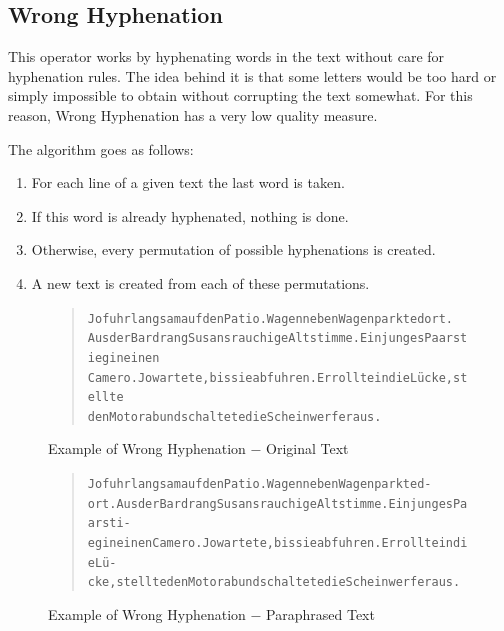 \documentclass[11pt]{reportAlternative}
\begin{document}
\subsection{Wrong Hyphenation}
This operator works by hyphenating words in the text without care for hyphenation rules. The idea behind it is that some letters would be too hard or simply impossible to obtain without corrupting the text somewhat.
For this reason, Wrong Hyphenation has a very low quality measure.

The algorithm goes as follows:
\begin{enumerate}
\item For each line of a given text the last word is taken.
\item If this word is already hyphenated, nothing is done.
\item Otherwise, every permutation of possible hyphenations is created.
\item A new text is created from each of these permutations.
\end{enumerate}

\begin{figure}[H]
	\begin{quote}
		\begin{alltt}
			Jo fuhr langsam auf den Patio. Wagen neben Wagen parkte dort. 
			Aus der Bar drang Susans rauchige Altstimme. Ein junges Paar stieg in einen
			Camero. Jo wartete, bis sie abfuhren. Er rollte in die Lücke, stellte
			den Motor ab und schaltete die Scheinwerfer aus.
		\end{alltt}
	\end{quote}
	\caption{Example of Wrong Hyphenation $-$ Original Text}
\end{figure}

\begin{figure}[H]
	\begin{quote}
		\begin{alltt}
			Jo fuhr langsam auf den Patio. Wagen neben Wagen parkte d-
			ort. Aus der Bar drang Susans rauchige Altstimme. Ein junges Paar sti-
			eg in einen Camero. Jo wartete, bis sie abfuhren. Er rollte in die Lü-
			cke, stellte den Motor ab und schaltete die Scheinwerfer aus.
		\end{alltt}
	\end{quote}
	\caption{Example of Wrong Hyphenation $-$ Paraphrased Text}
\end{figure}
\end{document}
